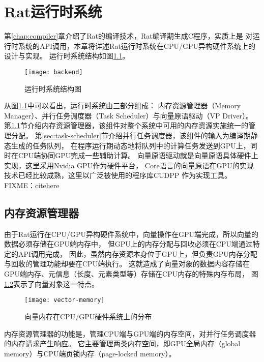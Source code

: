 \chapter{Rat运行时系统}
第\ref{chap:compiler}章介绍了Rat的编译技术，Rat编译期生成C程序，实质上是
对运行时系统的API调用，本章将详述Rat运行时系统在CPU/GPU异构硬件系统上的设计与实现。
运行时系统结构如图\ref{fig:backend}。
\begin{figure}
  \centering
  \texttt{[image: backend]}
  \caption{运行时系统结构图}
  \label{fig:backend}
\end{figure}

从图\ref{fig:backend}中可以看出，运行时系统由三部分组成：
内存资源管理器（Memory Manager）、并行任务调度器（Task Scheduler）与向量原语驱动（VP Driver）。
第\ref{sec:memory-manager}节介绍内存资源管理器，该组件对整个系统中可用的内存资源实施统一的管理分配。
第\ref{sec:task-scheduler}节介绍并行任务调度器，该组件的输入为编译期静态生成的任务队列，
在程序运行期动态地将队列中的计算任务发送到GPU上，同时在CPU端协同GPU完成一些辅助计算。
向量原语驱动就是向量原语具体硬件上实现，这里采用Nvidia GPU作为硬件平台，
Core语言的向量原语在GPU的实现技术已经比较成熟，这里以广泛被使用的程序库CUDPP
作为实现工具。FIXME：citehere

\section{内存资源管理器}\label{sec:memory-manager}
由于Rat运行在CPU/GPU异构硬件系统中，向量操作在GPU端完成，所以向量的数据必须存储在GPU端内存中，
但GPU上的内存分配与回收必须在CPU端通过特定的API调用完成，
因此，虽然内存资源本身位于GPU上，但负责GPU内存分配与回收的管理功能却要在CPU端执行。
这就造成了向量对象的数据内容存储在GPU端内存、元信息（长度、元素类型等）存储在CPU内存的特殊内存布局，
图\ref{fig:vector-memory}表示了向量对象这一特点。
\begin{figure}
  \centering
  \texttt{[image: vector-memory]}
  \caption[向量内存分布]{向量内存在CPU/GPU硬件系统上的分布}
  \label{fig:vector-memory}
\end{figure}

内存资源管理器的功能是，管理CPU端与GPU端的内存空间，对并行任务调度器的内存请求产生响应。
它主要管理两类内存空间，即GPU全局内存（global memory）与CPU端页锁内存（page-locked memory）。

